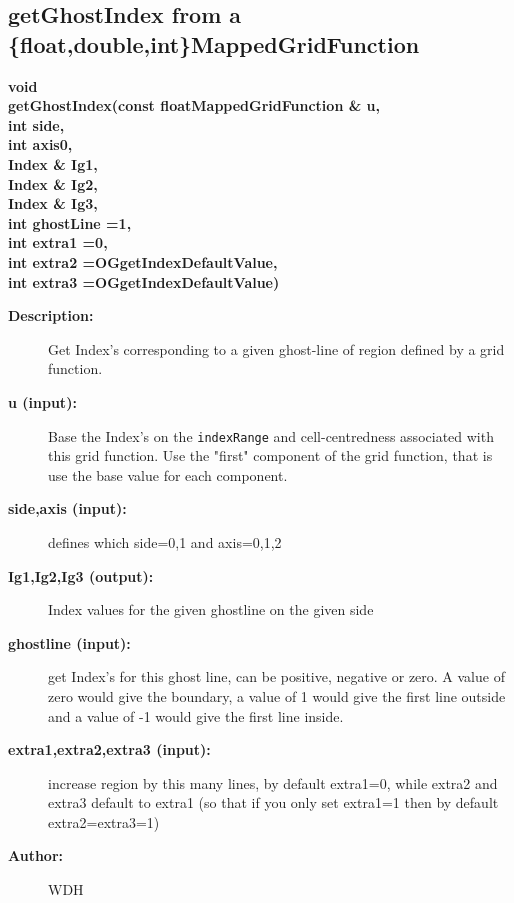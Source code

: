 \subsection{getGhostIndex from a \{float,double,int\}MappedGridFunction}
 
\begin{flushleft} \textbf{%
void  \\ 
\settowidth{\OGgetIndexIncludeArgIndent}{getGhostIndex(}%
getGhostIndex(const floatMappedGridFunction \& u, \\ 
\hspace{\OGgetIndexIncludeArgIndent}int side, \\ 
\hspace{\OGgetIndexIncludeArgIndent}int axis0, \\ 
\hspace{\OGgetIndexIncludeArgIndent}Index \& Ig1, \\ 
\hspace{\OGgetIndexIncludeArgIndent}Index \& Ig2, \\ 
\hspace{\OGgetIndexIncludeArgIndent}Index \& Ig3, \\ 
\hspace{\OGgetIndexIncludeArgIndent}int ghostLine =1,\\ 
\hspace{\OGgetIndexIncludeArgIndent}int extra1 =0,\\ 
\hspace{\OGgetIndexIncludeArgIndent}int extra2 =OGgetIndexDefaultValue,\\ 
\hspace{\OGgetIndexIncludeArgIndent}int extra3   =OGgetIndexDefaultValue)
}\end{flushleft}
\begin{description}
\item[{\bf Description:}] 
    Get Index's corresponding to a given ghost-line of region defined by a grid function.
\item[{\bf u (input):}]  Base the Index's on the {\tt indexRange} and cell-centredness associated   
     with this grid function. Use the "first" component of the grid function, that is
     use the base value for each component.
\item[{\bf side,axis (input):}]  defines which side=0,1 and axis=0,1,2
\item[{\bf Ig1,Ig2,Ig3 (output):}]  Index values for the given ghostline on the given side
\item[{\bf ghostline (input):}]  get Index's for this ghost line, can be positive, negative or zero.
        A value of zero would give the boundary, a value of 1 would give the first
        line outside and a value of -1 would give the first line inside.
\item[{\bf extra1,extra2,extra3 (input):}]  increase region by this many lines, by default extra1=0, while 
                         extra2 and extra3 default to extra1 (so that if you only set extra1=1
                         then by default extra2=extra3=1)
\item[{\bf Author:}]  WDH
\end{description}

